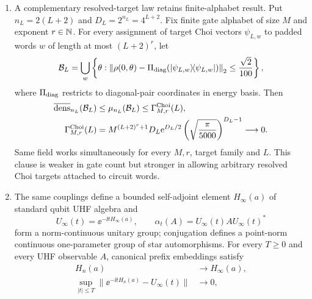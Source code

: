 \begin{theorem}
\begin{enumerate}[leftmargin=1.7em]
      correction decays as $1/(T\Delta_{n,N}^{\rm nz})$ and all system-specific input
      is finite spectroscopy.
\item A complementary resolved-target law retains finite-alphabet result.
      Put $n_L=2(L+2)$ and $D_L=2^{n_L}=4^{L+2}$.  Fix finite gate alphabet
      of size $M$ and exponent $r\in\mathbb N$.  For every assignment of target Choi
      vectors $\psi_{L,w}$ to padded words $w$ of length at most $(L+2)^r$,
      let
      \begin{equation}
       \mathcal B_L=\bigcup_w\left\{\theta:
       \left\|\rho(0,\theta)-
       \Pi_{\rm diag}(|\psi_{L,w}\rangle\!\langle\psi_{L,w}|)\right\|_2
       \le\frac{\sqrt2}{100}\right\},               \label{eq:samefieldchoiset}
      \end{equation}
      where $\Pi_{\rm diag}$ restricts to diagonal-pair coordinates in
      energy basis.  Then
      \begin{align}
       \overline{\operatorname{dens}}_{n_L}(\mathcal B_L)
       &\le\mu_{n_L}(\mathcal B_L)\le\Gamma^{\rm Choi}_{M,r}(L),
                                                              \label{eq:samefieldchoiplateau}\\
       \Gamma^{\rm Choi}_{M,r}(L)&=
       M^{(L+2)^r+1}D_L\mathrm e^{D_L/2}
       \left(\sqrt{\frac{\pi}{5000}}\right)^{D_L-1}
       \longrightarrow0.                              \label{eq:samefieldchoicost}
      \end{align}
      Same field works simultaneously for every $M,r$, target family and
      $L$.  This clause is weaker in gate count but stronger in allowing
      arbitrary resolved Choi targets attached to circuit words.
\item The same couplings define a bounded self-adjoint element
      $H_\infty(a)$ of standard qubit UHF algebra
      \cite{BratteliRobinson1997} and
      \begin{equation}
       U_\infty(t)=\ee^{-\ii tH_\infty(a)},\qquad
       \alpha_t(A)=U_\infty(t)A U_\infty(t)^*          \label{eq:samefieldUHF}
      \end{equation}
      form a norm-continuous unitary group; conjugation defines a point-norm
      continuous one-parameter group of star automorphisms.  For every $T\ge0$ and every
      UHF observable $A$, canonical prefix embeddings satisfy
      \begin{align}
       H_n(a)&\longrightarrow H_\infty(a),             \label{eq:samefieldHconv}\\
       \sup_{|t|\le T}\|\ee^{-\ii tH_n(a)}-U_\infty(t)\|&\longrightarrow0,

\end{align}
\end{enumerate}
\end{theorem}
